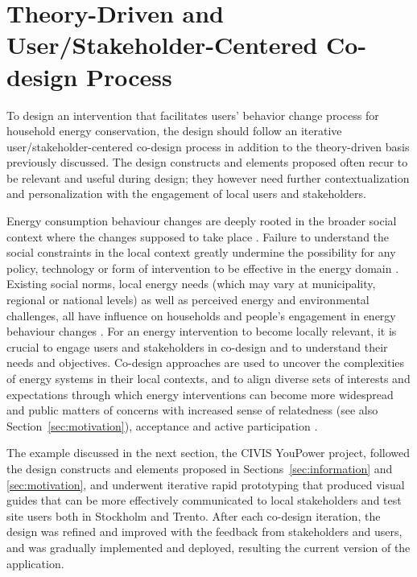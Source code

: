 \documentclass[a4paper]{article}
\begin{document}
\section{Theory-Driven and User/Stakeholder-Centered Co-design Process}
\label{sec:codesign}

To design an intervention that facilitates users' behavior change process for household energy conservation, the design should follow an iterative user/stakeholder-centered co-design process in addition to the theory-driven basis previously discussed. The design constructs and elements proposed often recur to be relevant and useful during design; they however need further contextualization and personalization with the engagement of local users and stakeholders. 

Energy consumption behaviour changes are deeply rooted in the broader social context where the changes supposed to take place \citep{Owens2008}. Failure to understand the social constraints in the local context greatly undermine the possibility for any policy, technology or form of intervention to be effective in the energy domain \citep{Devine-Wright2005}. Existing social norms, local energy needs (which may vary at municipality, regional or national levels) as well as perceived energy and environmental challenges, all have influence on households and people's engagement in energy behaviour changes \citep{+}. For an energy intervention to become locally relevant, it is crucial to engage users and stakeholders in co-design and to understand their needs and objectives. Co-design approaches are used to uncover the complexities of energy systems in their local contexts, and to align diverse sets of interests and expectations \citep{Tang2008,Dick2012} through which energy interventions can become more widespread and public matters of concerns \citep{DiSalvo2014} with increased sense of relatedness (see also Section~\ref{sec:motivation}), acceptance and active participation \citep{Throndsen2015,Marres2012,Brynjarsdottir2012,pierce2003state,schwartz2015people,edward2015review}. 

The example discussed in the next section, the CIVIS YouPower project, followed the design constructs and elements proposed in Sections~\ref{sec:information} and \ref{sec:motivation}, and underwent iterative rapid prototyping that produced visual guides that can be more effectively communicated to local stakeholders and test site users both in Stockholm and Trento. After each co-design iteration, the design was refined and improved with the feedback from stakeholders and users, and was gradually implemented and deployed, resulting the current version of the application.
\end{document}
